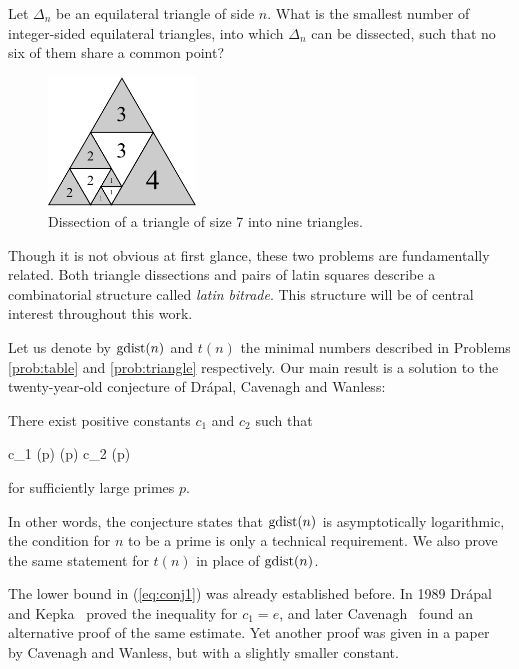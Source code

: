 \begin{prob-intro}
\label{prob:triangle}
Let $\Delta_n$ be an equilateral triangle of side $n$. What is the smallest number of integer-sided equilateral triangles, into which $\Delta_n$ can be dissected, such that no six of them share a common point?
\end{prob-intro}

\begin{figure}[htb]
\centering
\includegraphics[width=0.35\textwidth]{img/dissection7.pdf}
\caption{Dissection of a triangle of size 7 into nine triangles.}
\label{fig:dissection7}
\end{figure}

Though it is not obvious at first glance, these two problems are fundamentally related. Both triangle dissections and pairs of latin squares describe a combinatorial structure called \emph{latin bitrade}. This structure will be of central interest throughout this work.

Let us denote by $\mathop{\mathrm{gdist}}(n)$ and $t(n)$ the minimal numbers described in Problems \ref{prob:table} and \ref{prob:triangle} respectively. Our main result is a solution to the twenty-year-old conjecture of Drápal, Cavenagh and Wanless:

\begin{conj-intro}
\label{conj:main}
There exist positive constants $c_1$ and $c_2$ such that
\begin{cosyeqnarray}
	c_1 \log(p) \leq \gdist(p) \leq c_2 \log(p) \label{eq:conj1}
\end{cosyeqnarray}
for sufficiently large primes $p$.
\end{conj-intro}

In other words, the conjecture states that $\mathop{\mathrm{gdist}}(n)$ is asymptotically logarithmic, the condition for $n$ to be a prime is only a technical requirement. We also prove the same statement for $t(n)$ in place of $\mathop{\mathrm{gdist}}(n)$.

The lower bound in (\ref{eq:conj1}) was already established before. In 1989 Drápal and Kepka~\cite{DrapalKepka89} proved the inequality for $c_1 = e$, and later Cavenagh~\cite{Cavenagh03} found an alternative proof of the same estimate. Yet another proof was given in a paper~\cite{CavenaghWanless09} by Cavenagh and Wanless, but with a slightly smaller constant.

